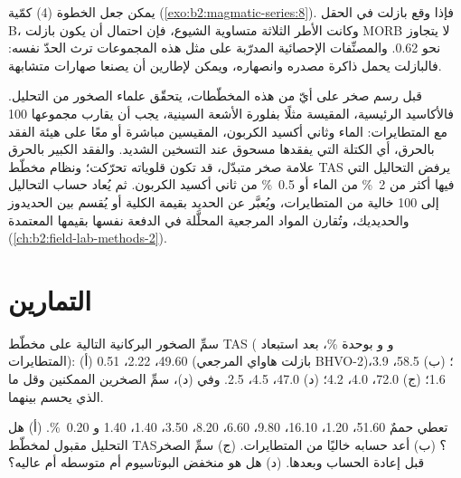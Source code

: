 يمكن جعل الخطوة (4) كمّية (\cref{exo:b2:magmatic-series:8}). فإذا وقع بازلت في الحقل B، وكانت
الأطر الثلاثة متساوية الشيوع، فإن احتمال أن يكون بازلت MORB لا يتجاوز نحو 0.62.
والمصنِّفات الإحصائية المدرّبة على مثل هذه المجموعات ترث الحدّ نفسه: فالبازلت
يحمل ذاكرة مصدره وانصهاره، ويمكن لإطارين أن يصنعا صهارات
متشابهة.

\begin{inthelab}
قبل رسم صخر على أيّ من هذه المخطّطات، يتحقّق علماء الصخور من التحليل. فالأكاسيد
الرئيسية، المقيسة مثلًا بفلورة الأشعة السينية، يجب أن يقارب مجموعها 100
مع المتطايرات: الماء وثاني أكسيد الكربون، المقيسين مباشرة أو معًا على هيئة
الفقد بالحرق، أي الكتلة التي يفقدها مسحوق عند التسخين الشديد. والفقد الكبير
بالحرق علامة صخر متبدّل، قد تكون قلوياته تحرّكت؛ ونظام مخطّط
TAS يرفض التحاليل التي فيها أكثر من \qty{2}{\percent} من الماء أو
\qty{0.5}{\percent} من ثاني أكسيد الكربون. ثم يُعاد حساب التحاليل إلى 100 خالية من
المتطايرات، ويُعبَّر عن الحديد بقيمة  الكلية أو يُقسم بين الحديدوز والحديديك،
وتُقارن المواد المرجعية المحلَّلة في الدفعة نفسها بقيمها
المعتمدة (\cref{ch:b2:field-lab-methods-2}).
\end{inthelab}

\section{التمارين}

\begin{exercise}[$\star$]\label{exo:b2:magmatic-series:1}
سمِّ الصخور البركانية التالية على مخطّط TAS ( و و
بوحدة \unit{\percent}، بعد استبعاد المتطايرات): (أ) 49.60، 2.22، 0.51 (بازلت هاواي
المرجعي BHVO-2)؛ (ب) 58.5، 3.9، 1.6؛ (ج) 72.0، 4.0، 4.2؛ (د) 47.0، 4.5، 2.5.
وفي (د)، سمِّ الصخرين الممكنين وقل ما الذي يحسم بينهما.
\end{exercise}

\begin{exercise}[$\star$]\label{exo:b2:magmatic-series:2}
تعطي حممٌ  51.60،  1.20،  16.10،  9.80،
 6.60،  8.20،  3.50،  1.40،  1.40
و \qty{0.20}{\percent}. (أ) هل التحليل مقبول لمخطّط TAS؟
(ب) أعد حسابه خاليًا من المتطايرات. (ج) سمِّ الصخر قبل إعادة
الحساب وبعدها. (د) هل هو منخفض البوتاسيوم أم متوسطه أم عاليه؟
\end{exercise}

